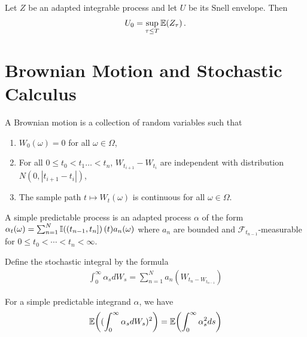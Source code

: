 \begin{thm}
  \label{sec:pric-hedg-cont-12}
  Let $Z$ be an adapted integrable process and let $U$ be its Snell
  envelope.  Then
  \begin{align}
    \label{eq:13}
    U_{0} = \sup_{\tau \leq T} \E{Z_{\tau}}.
  \end{align}
\end{thm}

\section{Brownian Motion and Stochastic Calculus}
\label{sec:brown-moti-stoch}

\newcommand{\ito}{Ito\xspace}

\begin{defn}
  \label{sec:brown-moti-stoch-1}
  A Brownian motion is a collection of random variables such that
  \begin{enumerate}
  \item $W_{0}(\omega) = 0$ for all $\omega \in \Omega$,
  \item For all $0 \leq t_{0} < t_{1} \dots < t_{n}$, $W_{t_{i+1}} -
    W_{t_{i}}$ are independent with distribution $N(0, |t_{i+1} - t_{i}|)$,
  \item The sample path $t \mapsto W_{t}(\omega)$ is continuous for
    all $\omega \in \Omega$.
  \end{enumerate}
\end{defn}

\begin{defn}
  \label{sec:brown-moti-stoch-2}
  A simple predictable process is an adapted process $\alpha$ of the
  form $\alpha_{t}(\omega) = \sum_{n=1}^{N} \I{(t_{n-1}, t_{n}]}(t)
  a_{n}(\omega)$ where $a_{n}$ are bounded and
  $\mathcal{F}_{t_{n-1}}$-measurable for $0 \leq t_{0} < \cdots < t_{n}
  < \infty$.

  Define the stochastic integral by the formula
  \begin{align}
    \label{eq:14}
    \int_{0}^{\infty} \alpha_{s} dW_{s} = \sum_{n=1}^{N}  a_{n}
    (W_{t_{n} - W_{t_{n-1}}})
  \end{align}
\end{defn}

\begin{thm}[\ito's Isometry]
  \label{sec:brown-moti-stoch-3}
  For a simple predictable integrand $\alpha$, we have
  \begin{align}
    \label{eq:15}
    \E{(\int_{0}^{\infty} \alpha_{s} dW_{s})^{2}} =
    \E{\int_{0}^{\infty} \alpha_{s}^{2} ds}
  \end{align}
\end{thm}


